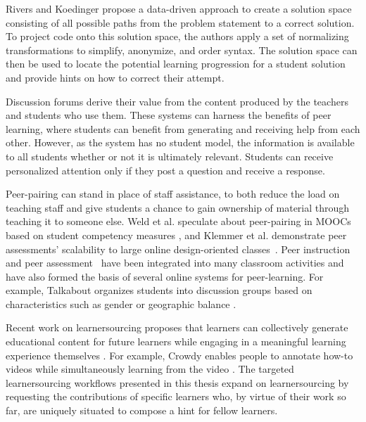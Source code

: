 Rivers and Koedinger \cite{riversaied} propose a data-driven approach to create a solution space consisting of all possible paths from the problem statement to a correct solution. To project code onto this solution space, the authors apply a set of normalizing transformations to simplify, anonymize, and order syntax. The solution space can then be used to locate the potential learning progression for a student solution and provide hints on how to correct their attempt.

Discussion forums derive their value from the content produced by the teachers and students who use them. These systems can harness the benefits of peer learning, where students can benefit from generating and receiving help from each other. However, as the system has no student model, the information is available to all students whether or not it is ultimately relevant. Students can receive personalized attention only if they post a question and receive a response. 

Peer-pairing can stand in place of staff assistance, to both reduce the load on teaching staff and give students a chance to gain ownership of material through teaching it to someone else. Weld et al. speculate about peer-pairing in MOOCs based on student competency measures \cite{WeldHcomp12}, and Klemmer et al. demonstrate peer assessments' scalability to large online design-oriented classes~\cite{Klemmer}. Peer instruction~\cite{mazur} and peer assessment~\cite{peerassessment} have been integrated into many classroom activities and have also formed the basis of several online systems for peer-learning. For example, Talkabout organizes students into discussion groups based on characteristics such as gender or geographic balance \cite{talkabout}.

Recent work on learnersourcing proposes that learners can collectively generate educational content for future learners while engaging in a meaningful learning experience themselves \cite{kim2013learnersourcing,weir2015,mitros2015}. For example, Crowdy enables people to annotate how-to videos while simultaneously learning from the video \cite{weir2015}. The targeted learnersourcing workflows presented in this thesis expand on learnersourcing by requesting the contributions of specific learners who, by virtue of their work so far, are uniquely situated to compose a hint for fellow learners. %

